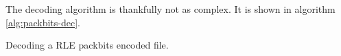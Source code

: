The decoding algorithm is thankfully not as complex. It is shown in
algorithm \ref{alg:packbits-dec}.

\begin{algorithm}
  \caption{Decoding a RLE packbits encoded file.}
  \label{alg:packbits-dec}
  \begin{algorithmic}[1]


    \While{\neof}



        \State {}
        \EndRepeatn
      \Else

        \State {}
        \EndRepeatn

      \EndIf


    \EndWhile
  \end{algorithmic}
\end{algorithm}

\FloatBarrier

\answers{}

